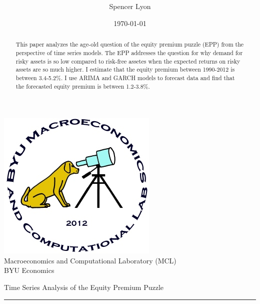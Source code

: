 \documentclass[a4paper, 11pt, twoside]{article}
\title{
    \vspace{-.6in}
    \usefont{OT1}{bch}{b}{n}
    \normalfont \normalsize \textsc{ } \\ [25pt]
    \horrule{0.5pt}
    \huge \thetitle \\
    \horrule{2pt}
  }
\author{
    Spencer Lyon
  }
\date{
  \normalfont \normalsize
  \today \\[-4pt] \normalsize
  }
\theoremstyle{definition} %
\numberwithin{equation}{section}
\newcommand \thetitle{Time Series Analysis of the Equity Premium Puzzle}
\begin{document}
\begin{titlepage}
  \maketitle
  \thispagestyle{empty}
  \begin{center}

  \includegraphics{logo} \\ [0.8cm] %

  Macroeconomics and Computational Laboratory (MCL) \\[0.5cm] %
  BYU Economics\\[1.5cm]  %

  \begin{abstract}
      \normalsize
        This paper analyzes the age-old question of the equity premium puzzle (EPP) from the perspective of time series models. The EPP addresses the question for why demand for risky assets is so low compared to risk-free assetes when the expected returns on risky assets are so much higher. I estimate that the equity premium between 1990-2012 is between 3.4-5.2\%. I use ARIMA and GARCH models to forecast data and find that the forecasted equity premium is between 1.2-3.8\%.
  \end{abstract}
  \end{center}
  \tableofcontents
\end{titlepage}

\newpage
{}  %
\setcounter{page}{1}  %

\begin{center}
\huge{\thetitle}  %
\rule{\linewidth}{.1pt}
\end{center}
\end{document}
